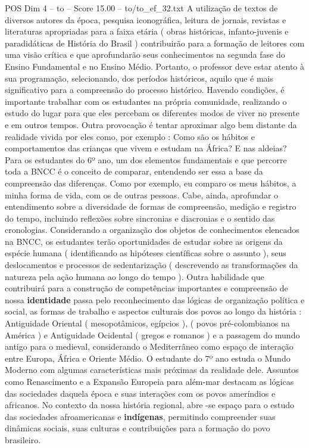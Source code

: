 \begin{textsample}{POS Dim 4 – to – Score 15.00 – to/to\_ef\_32.txt}
A utilização de textos de diversos autores da época, pesquisa iconográfica, leitura de jornais, revistas e literaturas apropriadas para a faixa etária ( obras históricas, infanto-juvenis e paradidáticas de História do Brasil ) contribuirão para a formação de leitores com uma visão crítica e que aprofundarão seus conhecimentos na segunda fase do Ensino Fundamental e no Ensino Médio.
Portanto, o professor deve estar atento à sua programação, selecionando, dos períodos históricos, aquilo que é mais significativo para a compreensão do processo histórico.
Havendo condições, é importante trabalhar com os estudantes na própria comunidade, realizando o estudo do lugar para que eles percebam os diferentes modos de viver no presente e em outros tempos.
Outra provocação é tentar aproximar algo bem distante da realidade vivida por eles como, por exemplo : Como são os hábitos e comportamentos das crianças que vivem e estudam na África?
E nas aldeias?
Para os estudantes do 6º ano, um dos elementos fundamentais e que percorre toda a BNCC é o conceito de comparar, entendendo ser essa a base da compreensão das diferenças.
Como por exemplo, eu comparo os meus hábitos, a minha forma de vida, com os de outras pessoas.
Cabe, ainda, aprofundar o entendimento sobre a diversidade de formas de compreensão, medição e registro do tempo, incluindo reflexões sobre sincronias e diacronias e o sentido das cronologias.
Considerando a organização dos objetos de conhecimentos elencados na BNCC, os estudantes terão oportunidades de estudar sobre as origens da espécie humana ( identificando as hipóteses científicas sobre o assunto ), seus deslocamentos e processos de sedentarização ( descrevendo as transformações da natureza pela ação humana ao longo do tempo ).
Outra habilidade que contribuirá para a construção de competências importantes e compreensão de nossa \textbf{identidade} passa pelo reconhecimento das lógicas de organização política e social, as formas de trabalho e aspectos culturais dos povos ao longo da história : Antiguidade Oriental ( mesopotâmicos, egípcios ), ( povos pré-colombianos na América ) e Antiguidade Ocidental ( gregos e romanos ) e a passagem do mundo antigo para o medieval, considerando o Mediterrâneo como espaço de interação entre Europa, África e Oriente Médio.
O estudante do 7º ano estuda o Mundo Moderno com algumas características mais próximas da realidade dele.
Assuntos como Renascimento e a Expansão Europeia para além-mar destacam as lógicas das sociedades daquela época e suas interações com os povos ameríndios e africanos.
No contexto da nossa história regional, abre -se espaço para o estudo das sociedades afroamericanas e \textbf{indígenas}, permitindo compreender suas dinâmicas sociais, suas culturas e contribuições para a formação do povo brasileiro.

\end{textsample}
